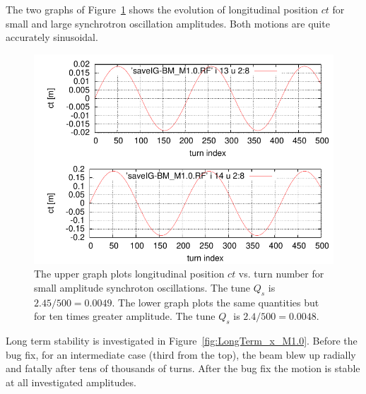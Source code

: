 \documentclass[]{article}
\begin{document}
The two graphs of Figure~\ref{fig:Q_sVsSynchAmplitude} 
shows the evolution of longitudinal position $ct$ for small
and large synchrotron oscillation amplitudes. Both
motions are quite accurately sinusoidal.
%
\begin{figure}[h]
\centering
\includegraphics[scale=0.8]{pdf/Q_sVsSynchAmplitude.pdf}
\caption{\label{fig:Q_sVsSynchAmplitude}The upper graph
plots longitudinal position $ct$ vs. turn number for
small amplitude synchroton oscillations. The tune $Q_s$
is $2.45/500=0.0049$. The lower graph
plots the same quantities but for ten times greater
amplitude. The tune $Q_s$ is $2.4/500=0.0048$. 
}
\end{figure}
%

\clearpage

Long term stability is investigated in Figure~\ref{fig:LongTerm_x_M1.0}.
Before the bug fix, for an intermediate case (third from the top), the 
beam blew up radially and fatally after tens of thousands of turns. 
After the bug fix the motion is stable at all investigated amplitudes.
\end{document}
